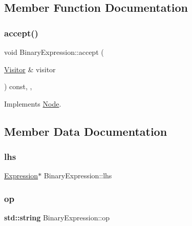 \subsection{Member Function Documentation}
\mbox{\label{struct_binary_expression_af8318bd8b21b4bbca064e8a6086a10a0}} 
\subsubsection{\texorpdfstring{accept()}{accept()}}
{\footnotesize\ttfamily void Binary\+Expression\+::accept (\begin{DoxyParamCaption}\item[{\hyperlink{struct_visitor}{Visitor} \&}]{visitor }\end{DoxyParamCaption}) const\hspace{0.3cm}{\ttfamily [inline]}, {\ttfamily [override]}, {\ttfamily [virtual]}}



Implements \hyperlink{struct_node_a10bd7af968140bbf5fa461298a969c71}{Node}.



\subsection{Member Data Documentation}
\mbox{\label{struct_binary_expression_ae689284a646929c99e634e75f50cb32c}} 
\subsubsection{\texorpdfstring{lhs}{lhs}}
{\footnotesize\ttfamily \hyperlink{struct_expression}{Expression}$\ast$ Binary\+Expression\+::lhs}

\mbox{\label{struct_binary_expression_a4c33b66e2ffc0a5ede2cdd190bf4bd75}} 
\subsubsection{\texorpdfstring{op}{op}}
{\footnotesize\ttfamily \textbf{ std\+::string} Binary\+Expression\+::op}

